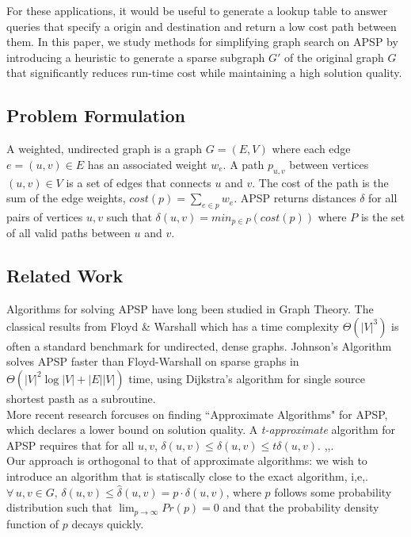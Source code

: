 \documentclass[10.5pt,journal]{IEEEtran}
\begin{document}
 For these applications, it would
be useful to generate a lookup table to answer queries that specify a origin and destination and return a
low cost path between them. In this paper, we study methods for simplifying graph search on APSP by introducing
a heuristic to generate a sparse subgraph $G'$ of the original graph $G$ that significantly reduces run-time
cost while maintaining a high solution quality.

\subsection{Problem Formulation}
	A weighted, undirected graph is a graph $G=(E,V)$ where each edge $e=(u,v)\in E$ has an associated weight
	$w_e$. A path $p_{u,v}$ between vertices $(u,v)\in V$ is a set of edges that connects $u$ and $v$. The cost
	of the path is the sum of the edge weights, $cost(p) = \sum_{e\in p}w_e$. APSP returns distances $\delta$
	for all pairs of vertices $u,v$ such that $\delta(u,v) = min_{p\in P} (cost(p))$ where $P$ is the set of
	all valid paths between $u$ and $v$.

\subsection{Related Work}
	Algorithms for solving APSP have long been studied in Graph Theory. The classical results from
	Floyd \& Warshall \cite{floydWarshall}
	which has a time complexity $\Theta(|V|^3)$ is often a standard benchmark for undirected, dense graphs.
	Johnson's Algorithm
	\cite{johnson}
	solves APSP faster than Floyd-Warshall on sparse graphs in $\Theta(|V|^2 \log|V|+ |E||V|)$ time,
	using Dijkstra's algorithm for single source shortest pasth as a subroutine. \\
	
	More recent research forcuses on finding ``Approximate Algorithms" for APSP, which declares a
	lower bound on solution quality. A {\it{t-approximate}} algorithm for APSP requires that
	for all $u,v$, $\delta(u,v) \le \hat{\delta}(u,v) \le t\delta(u,v)$.
	\cite{approx1},\cite{approx2},\cite{neuralNet}. \\
	
	Our approach is orthogonal to that of approximate algorithms: we wish to introduce an algorithm
	that is statiscally close to the exact algorithm, i,e,. $\forall\,u,v \in G,\, 
	\delta(u,v) \le \hat{\delta}(u,v) = p\cdot\delta(u,v)$, where $p$ follows some probability
	distribution such that $\lim_{p\rightarrow\infty}Pr(p) = 0$ and that the probability density function
	of $p$ decays quickly.
	
\end{document}
